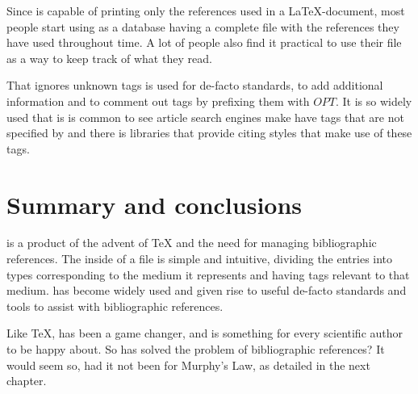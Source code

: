 Since {\bibtex} is capable of printing only the references used in a
{\LaTeX}-document, most people start using {\bibtex} as a database
having a complete file with the references they have used throughout
time.  A lot of people also find it practical to use their {\bibtex}
file as a way to keep track of what they read.

That {\bibtex} ignores unknown tags is used for de-facto standards, to
add additional information and to comment out tags by prefixing them
with $OPT$.  It is so widely used that is is common to see article
search engines make have tags that are not specified by {\bibtex} and
there is libraries that provide citing styles that make use of these
tags.


\section{Summary and conclusions}
\label{sec:about_conclusion}


{\bibtex} is a product of the advent of {\TeX} and the need for
managing bibliographic references.  The inside of a {\bibtex} file is
simple and intuitive, dividing the entries into types corresponding
to the medium it represents and having tags relevant to that medium.
{\bibtex} has become widely used and given rise to useful de-facto
standards and tools to assist with bibliographic references.

Like {\TeX}, {\bibtex} has been a game changer, and is something for
every scientific author to be happy about.  So has {\bibtex} solved the
problem of bibliographic references? It would seem so, had it not been
for Murphy's Law, as detailed in the next chapter.


%
%
